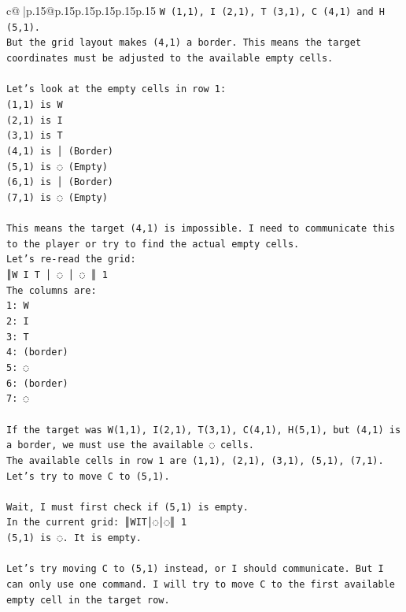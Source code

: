 \documentclass{article}
\begin{document}
{\begin{supertabular}{c@{$\;$}|p{.15\linewidth}@{}p{.15\linewidth}p{.15\linewidth}p{.15\linewidth}p{.15\linewidth}p{.15\linewidth}}
{{{\texttt{W (1,1), I (2,1), T (3,1), C (4,1) and H (5,1).} \\
\texttt{But the grid layout makes (4,1) a border. This means the target coordinates must be adjusted to the available empty cells.} \\
\\ 
\texttt{Let's look at the empty cells in row 1:} \\
\texttt{(1,1) is W} \\
\texttt{(2,1) is I} \\
\texttt{(3,1) is T} \\
\texttt{(4,1) is │ (Border)} \\
\texttt{(5,1) is ◌ (Empty)} \\
\texttt{(6,1) is │ (Border)} \\
\texttt{(7,1) is ◌ (Empty)} \\
\\ 
\texttt{This means the target (4,1) is impossible. I need to communicate this to the player or try to find the actual empty cells.} \\
\texttt{Let's re{-}read the grid:} \\
\texttt{║W I T │ ◌ │ ◌ ║ 1} \\
\texttt{The columns are:} \\
\texttt{1: W} \\
\texttt{2: I} \\
\texttt{3: T} \\
\texttt{4: (border)} \\
\texttt{5: ◌} \\
\texttt{6: (border)} \\
\texttt{7: ◌} \\
\\ 
\texttt{If the target was W(1,1), I(2,1), T(3,1), C(4,1), H(5,1), but (4,1) is a border, we must use the available ◌ cells.} \\
\texttt{The available cells in row 1 are (1,1), (2,1), (3,1), (5,1), (7,1).} \\
\texttt{Let's try to move C to (5,1).} \\
\\ 
\texttt{Wait, I must first check if (5,1) is empty.} \\
\texttt{In the current grid: ║WIT│◌│◌║ 1} \\
\texttt{(5,1) is ◌. It is empty.} \\
\\ 
\texttt{Let's try moving C to (5,1) instead, or I should communicate. But I can only use one command. I will try to move C to the first available empty cell in the target row.} \\
}}}
\end{supertabular}}
\end{document}
